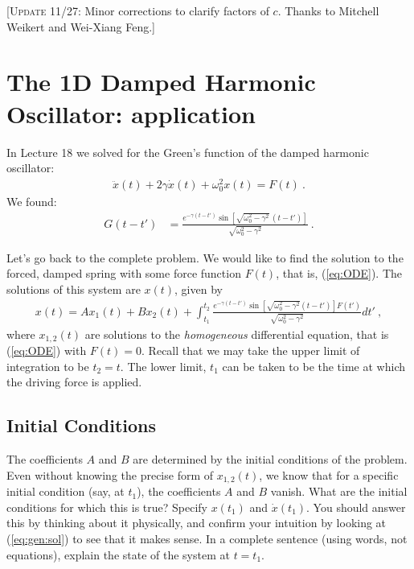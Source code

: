 \documentclass[12pt]{article}
\numberwithin{equation}{section}    %
\begin{document}
\textcolor{green!50!black}{[\textsc{Update 11/27}: Minor corrections to clarify factors of $c$. Thanks to Mitchell Weikert and Wei-Xiang Feng.]}



\section{The 1D Damped Harmonic Oscillator: application}

In Lecture 18 we solved for the Green's function of the damped harmonic oscillator:
\begin{align}
	\ddot x(t) + 2 \gamma \dot x(t) + \omega_0^2 x(t) = F(t) \ .
	\label{eq:ODE}
\end{align}
 We found:
\begin{align}
	G(t-t') &= \frac{
	e^{-\gamma(t-t')} 
	\sin\left[\sqrt{\omega_0^2-\gamma^2}\, (t-t')\right]
	}{\sqrt{\omega_0^2-\gamma^2}} \ .
\end{align}

Let's go back to the complete problem. We would like to find the solution to the forced, damped spring with some force function $F(t)$, that is, (\ref{eq:ODE}). The solutions of this system are $x(t)$, given by 
\begin{align}
	x(t) = A x_1(t) + B x_2(t) 
	+ 
	\int_{t_1}^{t_2}
	\frac{
	e^{-\gamma(t-t')}
	\sin \left[
	\sqrt{\omega_0^2 - \gamma^2} (t-t')
	\right]
	F(t')
	}{
	\sqrt{\omega_0^2 - \gamma^2}
	}
	dt' \ ,
	\label{eq:gen:sol}
\end{align}
where $x_{1,2}(t)$ are solutions to the \emph{homogeneous} differential equation, that is (\ref{eq:ODE}) with $F(t)=0$. 
%
Recall that we may take the upper limit of integration to be $t_2 = t$. The lower limit, $t_1$ can be taken to be the time at which the driving force is applied. 

\subsection{Initial Conditions}

The coefficients $A$ and $B$ are determined by the initial conditions of the problem. 
%
Even without knowing the precise form of $x_{1,2}(t)$, we know that for a specific initial condition (say, at $t_1$), the coefficients $A$ and $B$ vanish. What are the initial conditions for which this is true? Specify $x(t_1)$ and $\dot x(t_1)$. You should answer this by thinking about it physically, and confirm your intuition by looking at (\ref{eq:gen:sol}) to see that it makes sense. In a complete sentence (using words, not equations), explain the state of the system at $t=t_1$. 
\end{document}
